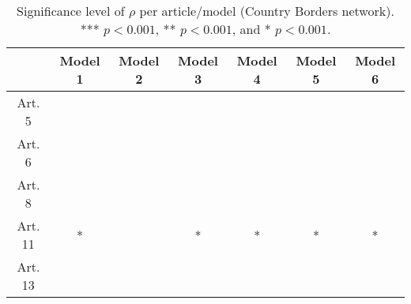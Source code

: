 \begin{table}[ht]
\centering
\begin{tabular}{ccccccc}
  \toprule
 & Model 1 & Model 2 & Model 3 & Model 4 & Model 5 & Model 6 \\ 
  \midrule
Art. 5 &   &   &   &   &   &   \\ 
   \midrule
Art. 6 &   &   &   &   &   &   \\ 
   \midrule
Art. 8 &   &   &   &   &   &   \\ 
   \midrule
Art. 11 & * &   & * & * & * & * \\ 
   \midrule
Art. 13 &   &   &   &   &   &   \\ 
   \bottomrule
\end{tabular}
\caption{Significance level of $\rho$ per article/model (Country Borders network). *** $p < 0.001$, ** $p < 0.001$, and * $p < 0.001$.} 
\end{table}
